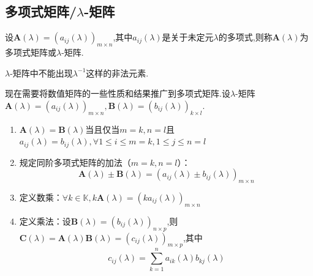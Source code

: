 \subsection{多项式矩阵/$\lambda$-矩阵}
\begin{formal}
\begin{definition}[$\lambda$-矩阵]\label{def:多项式矩阵}
    设$\bm{A}\left(\lambda\right)=\left(a_{ij}\left(\lambda\right)\right)_{m\times n}$,其中$a_{ij}\left(\lambda\right)$是关于未定元$\lambda$的多项式,则称$\bm{A}\left(\lambda\right)$为多项式矩阵或$\lambda$-矩阵.
\end{definition}
\end{formal}
\begin{red}
    \begin{remark}
        $\lambda$-矩阵中不能出现$\lambda^{-1}$这样的非法元素.
    \end{remark}
\end{red}
\begin{formal}
\begin{proposition}\label{prop:多项式矩阵性质}
    现在需要将数值矩阵的一些性质和结果推广到多项式矩阵.设$\lambda$-矩阵$\bm{A}\left(\lambda\right)=\left(a_{ij}\left(\lambda\right)\right)_{m\times n},\bm{B}\left(\lambda\right)=\left(b_{ij}\left(\lambda\right)\right)_{k\times l}$.
    
    \begin{enumerate}[label={\textup{(\arabic*)}}]
        \item $\bm{A}\left(\lambda\right)=\bm{B}\left(\lambda\right)$当且仅当$m=k,n=l$且$a_{ij}\left(\lambda\right)=b_{ij}\left(\lambda\right),\forall 1\leqslant i\leqslant m=k,1\leqslant j\leqslant n=l$
        \item 规定同阶多项式矩阵的加法（$m=k,n=l$）：\[
        \bm{A}\left(\lambda\right)\pm\bm{B}\left(\lambda\right)=\left(a_{ij}\left(\lambda\right)\pm b_{ij}\left(\lambda\right)\right)_{m\times n}
        \]
        \item 定义数乘：$\forall k\in \mathbb{K},k\bm{A}\left(\lambda\right)=\left(ka_{ij}\left(\lambda\right)\right)_{m\times n}$
        \item 定义乘法：设$\bm{B}\left(\lambda\right)=\left(b_{ij}\left(\lambda\right)\right)_{n\times p}$,则$\bm{C}\left(\lambda\right)=\bm{A}\left(\lambda\right)\bm{B}\left(\lambda\right)=\left(c_{ij}\left(\lambda\right)\right)_{m\times p}$,其中\[
        c_{ij}\left(\lambda\right)=
        \sum_{k=1}^{n}a_{ik}\left(\lambda\right)b_{kj}\left(\lambda\right)
        \]
    \end{enumerate}
\end{proposition}
\end{formal}
